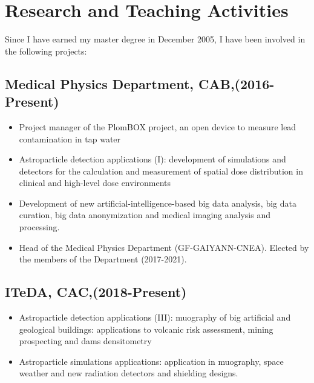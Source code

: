 \ifeng
\section*{Research and Teaching Activities}

Since I have earned my master degree in December 2005, I have been involved in the following projects:

\subsection*{Medical Physics Department, CAB,(2016-Present)}
\begin{itemize}
	\item Project manager of the PlomBOX project, an open device to measure lead contamination in tap water
	\item Astroparticle detection applications (I): development of
		simulations and detectors for the calculation and measurement
		of spatial dose distribution in clinical and high-level
		dose environments
 	\item Development of new artificial-intelligence-based big data analysis, big data curation, big data anonymization and medical imaging analysis and processing.
	\item Head of the Medical Physics Department (GF-GAIYANN-CNEA).
	Elected by the members of the Department (2017-2021).
\end{itemize}

\subsection*{ITeDA, CAC,(2018-Present)}
\begin{itemize}
	\item Astroparticle detection applications (III): muography of big artificial and geological buildings: applications
	to volcanic risk assessment, mining prospecting and dams densitometry
	\item Astroparticle simulations applications: application in muography, space weather and new radiation detectors
	and shielding designs.
\end{itemize}

